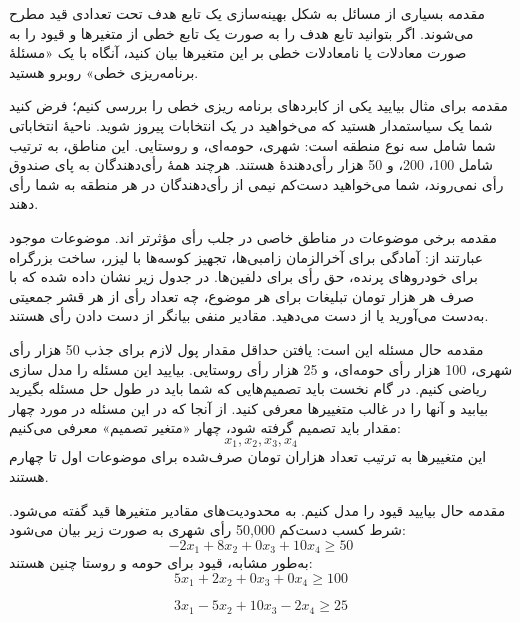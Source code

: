 \begin{itemframe}{مقدمه}
\itm
بسیاری از مسائل به شکل ‌بهینه‌سازی یک تابع هدف تحت تعدادی قید مطرح می‌شوند.
\itm
اگر بتوانید تابع هدف را به صورت یک تابع خطی از متغیرها و قیود را به صورت معادلات یا نامعادلات خطی بر این متغیرها بیان کنید، آنگاه با یک «مسئلهٔ برنامه‌ریزی خطی»
روبرو هستید.
\end{itemframe}


\begin{itemframe}{مقدمه}
\itm
برای مثال بیایید یکی از کابردهای برنامه ریزی خطی را بررسی کنیم؛
فرض کنید شما یک سیاستمدار هستید که می‌خواهید در یک انتخابات پیروز شوید.
\itm
ناحیهٔ انتخاباتی شما شامل سه نوع منطقه است: شهری، حومه‌ای، و روستایی.
این مناطق، به ترتیب شامل 100، 200، و 50 هزار رأی‌دهندهٔ هستند.
هرچند همهٔ رأی‌دهندگان به پای صندوق رأی نمی‌روند، شما می‌خواهید دست‌کم نیمی از رأی‌دهندگان در هر منطقه به شما رأی دهند.
\end{itemframe}


\begin{itemframe}{مقدمه}
\itm
برخی موضوعات در مناطق خاصی در جلب رأی مؤثرتر اند. موضوعات موجود عبارتند از: آمادگی برای آخرالزمان زامبی‌ها، تجهیز کوسه‌ها با لیزر، ساخت بزرگراه برای خودروهای پرنده، حق رأی برای دلفین‌ها.
\itm
در جدول زیر نشان داده‌ شده که با صرف هر هزار تومان تبلیغات برای هر موضوع، چه تعداد رأی از هر قشر جمعیتی به‌دست می‌آورید یا از دست می‌دهید. مقادیر منفی بیانگر از دست دادن رأی هستند.
\end{itemframe}


\begin{itemframe}{مقدمه}
\itm
حال مسئله این است: یافتن حداقل مقدار پول لازم برای جذب 50 هزار رأی شهری، 100 هزار رأی حومه‌ای، و 25 هزار رأی روستایی.
\itm
بیایید این مسئله را مدل سازی ریاضی کنیم. در گام نخست باید تصمیم‌هایی که شما باید در طول حل مسئله بگیرید بیابید و آنها را در غالب متغییرها معرفی کنید.
از آنجا که در این مسئله در مورد چهار مقدار باید تصمیم گرفته شود، چهار
«متغیر تصمیم»
 معرفی می‌کنیم:
$$
x_1, x_2, x_3, x_4
$$
این متغییرها به ترتیب تعداد هزاران تومان صرف‌شده برای موضوعات اول تا چهارم هستند.
\end{itemframe}


\begin{itemframe}{مقدمه}
\itm
حال بیایید قیود
را مدل کنیم. به محدودیت‌های مقادیر متغیرها قید گفته می‌شود. شرط کسب دست‌کم 50,000 رأی شهری به صورت زیر بیان می‌شود:
$$
-2x_1 + 8x_2 + 0x_3 + 10x_4 \ge 50
$$
\itm
به‌طور مشابه، قیود برای حومه و روستا چنین هستند:
$$
5x_1 + 2x_2 + 0x_3 + 0x_4 \ge 100
$$

$$
3x_1 - 5x_2 + 10x_3 - 2x_4 \ge 25
$$
\end{itemframe}


